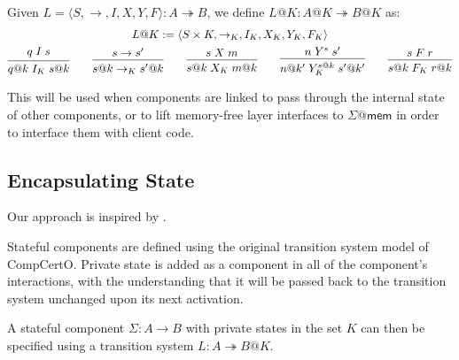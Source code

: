 \documentclass[acmsmall,screen,review,anonymous]{acmart}
\newcommand{\kw}[1]{\ensuremath{ \mathsf{#1} }}
\begin{document}
\begin{definition}[Lifting]
Given %
$L = \langle S, {\rightarrow}, I, X, Y, F \rangle : A \twoheadrightarrow B$,
we define $L@K : A@K \twoheadrightarrow B@K$ as:
\begin{gather*}
  L@K := \langle S \times K, {\rightarrow_K}, I_K, X_K, Y_K, F_K \rangle \\
 {\begin{prooftree}
    \hypo{q \mathrel{I} s}
    \infer1{q@k \mathrel{I_K} s@k}
  \end{prooftree}}
  \qquad
 {\begin{prooftree}
    \hypo{s \rightarrow s'}
    \infer1{s@k \rightarrow_K s'@k}
  \end{prooftree}}
  \qquad
 {\begin{prooftree}
    \hypo{s \mathrel{X} m}
    \infer1{s@k \mathrel{X_K} m@k}
  \end{prooftree}}
  \qquad
 {\begin{prooftree}
    \hypo{n \mathrel{Y}^s s'}
    \infer1{n@k' \mathrel{Y^{s@k}_K} s'@k'}
  \end{prooftree}}
  \qquad
 {\begin{prooftree}
    \hypo{s \mathrel{F} r}
    \infer1{s@k \mathrel{F_K} r@k}
  \end{prooftree}}
\end{gather*}
\end{definition}

This will be used when components are linked
to pass through the internal state of other components,
or to lift memory-free layer interfaces to $\Sigma@\kw{mem}$
in order to interface them with client code.



\subsection{Encapsulating State} %

Our approach is inspired by \citet{feedback,caots}.

Stateful components are defined using
the original transition system model of CompCertO.
Private state is added as a component
in all of the component's interactions,
with the understanding that
it will be passed back to the transition system
unchanged upon its next activation.

A stateful component $\Sigma : A \rightarrow B$
with private states in the set $K$
can then be specified using a transition system
$L : A \twoheadrightarrow B@K$.
\end{document}
